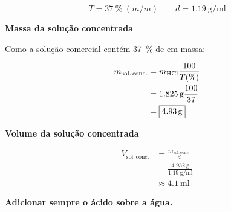 \documentclass[a4paper,12pt]{article}
\newcommand{\subtitulo}[1]{%
  \par\medskip
  {\color{quadroazul}\bfseries\large #1}\par\smallskip
}
\begin{document}
\begin{minipage}[t]{0.48\textwidth}
\begin{tcolorbox}[
  title=Dados da solução concentrada de \ce{HCl},
  colback=quadrocinza,
  colframe=black!65,
  boxrule=0.6pt,
  arc=1mm
]
\[
  T = \qty{37}{\percent}\;(m/m)
  \qquad
  d = \qty{1.19}{\gram\per\milli\litre}
\]
\end{tcolorbox}

\subtitulo{Massa da solução concentrada}

Como a solução comercial contém \qty{37}{\percent} de  em massa:

\begin{align*}
  m_{\mathrm{sol.\,conc.}}
    &= m_{\ce{HCl}}\frac{100}{T(\%)} \\
    &= \qty{1.825}{\gram}\frac{100}{37} \\
    &= \boxed{\qty{4.93}{\gram}}
\end{align*}

\subtitulo{Volume da solução concentrada}

\begin{align*}
  V_{\mathrm{sol.\,conc.}}
    &= \frac{m_{\mathrm{sol.\,conc.}}}{d} \\
    &= \frac{\qty{4.932}{\gram}}
             {\qty{1.19}{\gram\per\milli\litre}} \\
    &\approx \boxed{\qty{4.1}{\milli\litre}}
\end{align*}
\end{minipage}

\vspace{0.5cm}

\begin{tcolorbox}[
  colback=quadrovermelho!6,
  colframe=quadrovermelho,
  boxrule=1pt,
  arc=2mm
]
\centering
{\color{quadrovermelho}\bfseries\Large Adicionar sempre o ácido sobre a água.}
\end{tcolorbox}
\end{document}
